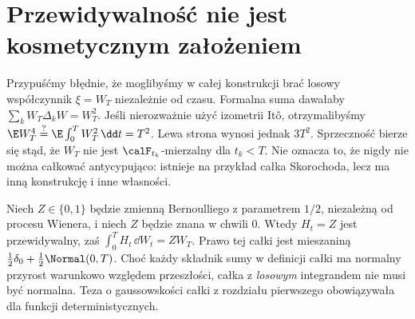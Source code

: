 \section{Przewidywalność nie jest kosmetycznym założeniem}
\begin{przyklad}
Przypuśćmy błędnie, że moglibyśmy w całej konstrukcji
brać losowy współczynnik $\xi=W_T$ niezależnie od
czasu. Formalna suma dawałaby
$\sum_kW_T\Delta_kW=W_T^2$.
Jeśli nierozważnie użyć izometrii Itô, otrzymalibyśmy
$\E W_T^4\overset{?}=\E\int_0^TW_T^2\,\dd t=T^2$.
Lewa strona wynosi jednak $3T^2$.
Sprzeczność bierze się stąd, że $W_T$ nie jest
$\calF_{t_k}$-mierzalny dla $t_k<T$.
Nie oznacza to, że nigdy nie można całkować
antycypująco: istnieje na przykład całka Skorochoda,
lecz ma inną konstrukcję i inne własności.
\end{przyklad}

\begin{przyklad}
Niech $Z\in\{0,1\}$ będzie zmienną Bernoulliego
z parametrem $1/2$, niezależną od procesu Wienera,
i niech $Z$ będzie znana w chwili $0$.
Wtedy $H_t=Z$ jest przewidywalny, zaś
$\int_0^TH_t\,\dd W_t=ZW_T$.
Prawo tej całki jest mieszaniną
$\frac12\delta_0+\frac12\Normal(0,T)$.
Choć każdy składnik sumy w definicji całki ma
normalny przyrost warunkowo względem przeszłości,
całka z \emph{losowym} integrandem nie musi być
normalna. Teza o gaussowskości całki z rozdziału
pierwszego obowiązywała dla funkcji deterministycznych.
\end{przyklad}


